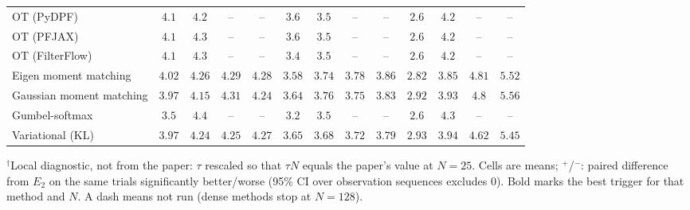 \begin{table}[ht]
\begin{adjustbox}{max width=\linewidth}
\begin{tabular}{lcccc|cccc|cccc}
OT (PyDPF) & $4.1$ & $4.2$ & -- & -- & $3.6$ & $3.5$ & -- & -- & $2.6$ & $4.2$ & -- & -- \\
OT (PFJAX) & $4.1$ & $4.3$ & -- & -- & $3.6$ & $3.5$ & -- & -- & $2.6$ & $4.2$ & -- & -- \\
OT (FilterFlow) & $4.1$ & $4.3$ & -- & -- & $3.4$ & $3.5$ & -- & -- & $2.6$ & $4.2$ & -- & -- \\
Eigen moment matching & $4.02$ & $4.26$ & $4.29$ & $4.28$ & $3.58$ & $3.74$ & $3.78$ & $3.86$ & $2.82$ & $3.85$ & $4.81$ & $5.52$ \\
Gaussian moment matching & $3.97$ & $4.15$ & $4.31$ & $4.24$ & $3.64$ & $3.76$ & $3.75$ & $3.83$ & $2.92$ & $3.93$ & $4.8$ & $5.56$ \\
Gumbel-softmax & $3.5$ & $4.4$ & -- & -- & $3.2$ & $3.5$ & -- & -- & $2.6$ & $4.3$ & -- & -- \\
Variational (KL) & $3.97$ & $4.24$ & $4.25$ & $4.27$ & $3.65$ & $3.68$ & $3.72$ & $3.79$ & $2.93$ & $3.94$ & $4.62$ & $5.45$ \\
\bottomrule
\end{tabular}
\end{adjustbox}
\par\smallskip\parbox{0.95\linewidth}{\footnotesize $^\dagger$Local diagnostic, not from the paper: $\tau$ rescaled so that $\tau N$ equals the paper's value at $N{=}25$. Cells are means; $^{+}$/$^{-}$: paired difference from $E_2$ on the same trials significantly better/worse (95\% CI over observation sequences excludes 0). Bold marks the best trigger for that method and $N$. A dash means not run (dense methods stop at $N{=}128$).}
\end{table}

